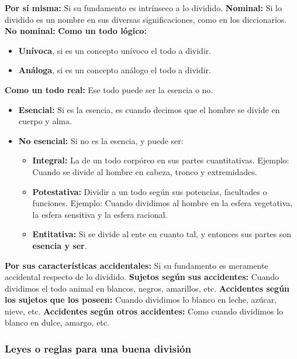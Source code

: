 \documentclass{article}
\begin{document}
\begin{outline}[enumerate]
    \1 \textbf{Por sí misma:} Si su fundamento es intrínseco a lo dividido.
    \2 \textbf{Nominal:} Si lo dividido es un nombre en sus diversas significaciones, como en los diccionarios.
    \2 \textbf{No nominal:}
    \3 \textbf{Como un todo lógico:}
    \begin{itemize}[label={$\bullet$}]
        \item \textbf{Unívoca}, si es un concepto unívoco el todo a dividir.
        \item \textbf{Análoga}, si es un concepto análogo el todo a dividir.
    \end{itemize}
    \3 \textbf{Como un todo real:} Ese todo puede ser la esencia o no.
    \begin{itemize}[label={$\bullet$}]
        \item \textbf{Esencial:} Si es la esencia, es cuando decimos que el hombre se divide en cuerpo y alma.
        \item \textbf{No esencial:} Si no es la esencia, y puede ser:
        \begin{itemize}[label={$-$}]
            \item \textbf{Integral:} La de un todo corpóreo en sus partes cuantitativas. Ejemplo: Cuando se divide al hombre en cabeza, tronco y extremidades.
            \item \textbf{Potestativa:} Dividir a un todo según sus potencias, facultades o funciones. Ejemplo: Cuando dividimos al hombre en la esfera vegetativa, la esfera sensitiva y la esfera racional.
            \item \textbf{Entitativa:} Si se divide al ente en cuanto tal, y entonces sus partes son \textbf{esencia y ser}.
        \end{itemize}
    \end{itemize}
    \1 \textbf{Por sus características accidentales:} Si su fundamento es meramente accidental respecto de lo dividido.
    \2 \textbf{Sujetos según sus accidentes:} Cuando dividimos el todo animal en blancos, negros, amarillos, etc.
    \2 \textbf{Accidentes según los sujetos que los poseen:} Cuando dividimos lo blanco en leche, azúcar, nieve, etc.
    \2 \textbf{Accidentes según otros accidentes:} Como cuando dividimos lo blanco en dulce, amargo, etc.
\end{outline}

\subsubsection{Leyes o reglas para una buena división} 
    
\end{document}
